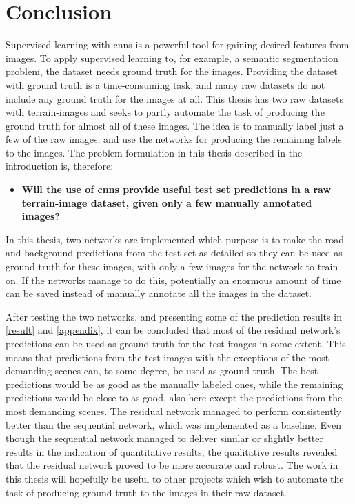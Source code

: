 \documentclass[USenglish]{ifimaster}  %
\begin{document}
\section{Conclusion}
Supervised learning with \acp{cnn} is a powerful tool for gaining desired features from images. To apply supervised learning to, for example, a semantic segmentation problem, the dataset needs ground truth for the images. Providing the dataset with ground truth is a time-consuming task, and many raw datasets do not include any ground truth for the images at all. This thesis has two raw datasets with terrain-images and seeks to partly automate the task of producing the ground truth for almost all of these images. The idea is to manually label just a few of the raw images, and use the networks for producing the remaining labels to the images. The problem formulation in this thesis described in the introduction is, therefore:
\begin{itemize}
\centering
  \item[] \textbf{Will the use of \acp{cnn} provide useful test set predictions in a raw terrain-image dataset, given only a few manually annotated images?} 
\end{itemize}
In this thesis, two networks are implemented which purpose is to make the road and background predictions from the test set as detailed so they can be used as ground truth for these images, with only a few images for the network to train on. If the networks manage to do this, potentially an enormous amount of time can be saved instead of manually annotate all the images in the dataset. 

After testing the two networks, and presenting some of the prediction results in \cref{result} and \cref{appendix}, it can be concluded that most of the residual network's predictions can be used as ground truth for the test images in some extent. This means that predictions from the test images with the exceptions of the most demanding scenes can, to some degree, be used as ground truth. The best predictions would be as good as the manually labeled ones, while the remaining predictions would be close to as good, also here except the predictions from the most demanding scenes. The residual network managed to perform consistently better than the sequential network, which was implemented as a baseline. Even though the sequential network managed to deliver similar or slightly better results in the indication of quantitative results, the qualitative results revealed that the residual network proved to be more accurate and robust. The work in this thesis will hopefully be useful to other projects which wish to automate the task of producing ground truth to the images in their raw dataset.
\end{document}
